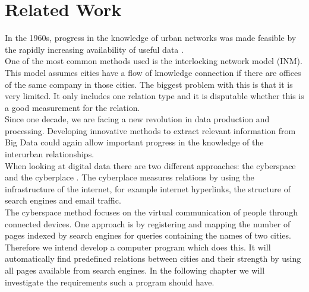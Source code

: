 \section{Related Work}
In the 1960s, progress in the knowledge of urban networks was made feasible by the rapidly increasing availability of useful data \cite{tornqvist1968flows}. \\
One of the most common methods used is the interlocking network model (INM)\cite{taylor2012interlocking}. This model assumes cities have a flow of knowledge connection if there are offices of the same company in those cities. The biggest problem with this is that it is very limited. It only includes one relation type and it is disputable whether this is a good measurement for the relation. \\

Since one decade, we are facing a new revolution in data production and processing. Developing innovative methods to extract relevant information from Big Data could again allow important progress in the knowledge of the interurban relationships. \\

When looking at digital data there are two different approaches: the cyberspace and the cyberplace \cite{devriendt2008cyberplace}. The cyberplace measures relations by using the infrastructure of the internet, for example internet hyperlinks, the structure of search engines and email traffic.  \\

The cyberspace method focuses on the virtual communication of people through connected devices. One approach is by registering and mapping the number of pages indexed by search engines for queries containing the names of two cities. 
 \\

Therefore we intend develop a computer program which does this. It will automatically find predefined relations between cities and their strength by using all pages available from search engines. In the following chapter we will investigate the requirements such a program should have.

